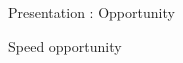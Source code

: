 \begin{Frame}{Presentation : Opportunity}
\begin{block}{Speed opportunity}
\end{block}

\end{Frame}

